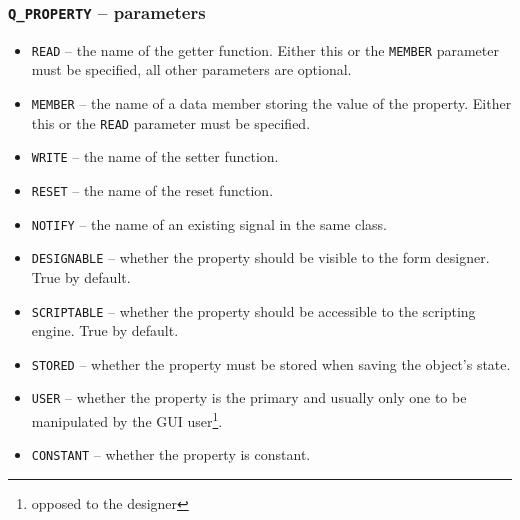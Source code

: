 \begin{frame}
  \frametitle{\texttt{Q\_PROPERTY} -- parameters}
  \footnotesize
  \begin{itemize}
    \item \texttt{READ} -- the name of the getter function. Either this or the
      \texttt{MEMBER} parameter must be specified, all other parameters are
      optional.
    \item \texttt{MEMBER} -- the name of a data member storing the value of
      the property. Either this or the \texttt{READ} parameter must be specified.
    \item \texttt{WRITE} -- the name of the setter function.
    \item \texttt{RESET} -- the name of the reset function.
    \item \texttt{NOTIFY} -- the name of an existing signal in the same class.
    \item \texttt{DESIGNABLE} -- whether the property should be visible to the
      form designer. True by default.
    \item \texttt{SCRIPTABLE} -- whether the property should be accessible to the
      scripting engine. True by default.
    \item \texttt{STORED} -- whether the property must be stored when saving the
      object's state.
    \item \texttt{USER} -- whether the property is the primary and usually only
      one to be manipulated by the GUI user\footnote{opposed to the designer}.
    \item \texttt{CONSTANT} -- whether the property is constant.
  \end{itemize}
\end{frame}

